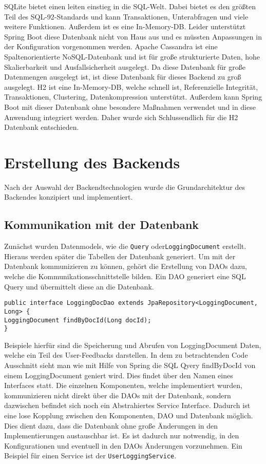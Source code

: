 SQLite bietet einen leiten einstieg in die SQL-Welt.
Dabei bietet es den größten Teil des SQL-92-Standards und kann Transaktionen, Unterabfragen und viele weitere Funktionen.
Außerdem ist es eine In-Memory-DB. 
Leider unterstützt Spring Boot diese Datenbank nicht von Haus aus und es müssten Anpassungen in der Konfiguration vorgenommen werden.
Apache Cassandra ist eine Spaltenorientierte NoSQL-Datenbank und ist für große strukturierte Daten, hohe Skalierbarkeit und Ausfallsicherheit ausgelegt.
Da diese Datenbank für große Datenmengen ausgelegt ist, ist diese Datenbank für dieses Backend zu groß ausgelegt.
H2 ist eine In-Memory-DB, welche schnell ist, Referenzielle Integrität, Transaktionen, Clustering, Datenkompression unterstützt.
Außerdem kann Spring Boot mit dieser Datenbank ohne besondere Maßnahmen verwendet und in diese Anwendung integriert werden.
Daher wurde sich Schlussendlich für die H2 Datenbank entschieden.

\section{Erstellung des Backends}
Nach der Auswahl der Backendtechnologien wurde die Grundarchitektur des Backendes konzipiert und implementiert.

\subsection{Kommunikation mit der Datenbank}
Zunächst wurden Datenmodels, wie die \texttt{Query} oder\texttt{LoggingDocument} erstellt. 
Hieraus werden später die Tabellen der Datenbank generiert.
Um mit der Datenbank kommunizieren zu können, gehört die Erstellung von DAOs dazu, welche die Kommunikationsschnittstelle bilden.  
Ein DAO generiert eine SQL Query und übermittelt diese an die Datenbank.
\begin{lstlisting}
public interface LoggingDocDao extends JpaRepository<LoggingDocument, Long> {
LoggingDocument findByDocId(Long docId);
}
\end{lstlisting}
Beispiele hierfür sind die Speicherung und Abrufen von LoggingDocument Daten, welche ein Teil des User-Feedbacks darstellen.
In dem zu betrachtenden Code Ausschnitt sieht man wie mit Hilfe von Spring die SQL Qyery findByDocId von einem LoggingDocument geniert wird.
Dies findet über den Namen eines Interfaces statt.
Die einzelnen Komponenten, welche implementiert wurden, kommunizieren nicht direkt über die DAOs mit der Datenbank, sondern dazwischen befindet sich noch ein Abstrahiertes Service Interface.
Dadurch ist eine lose Kopplung zwischen den Komponenten, DAO und Datenbank möglich.
Dies dient dazu, dass die Datenbank ohne große Änderungen in den Implementierungen austauschbar ist. 
Es ist dadurch nur notwendig, in den Konfigurationen und eventuell in den DAOs Änderungen vorzunehmen.
Ein Beispiel für einen Service ist der \texttt{UserLoggingService}.
 
